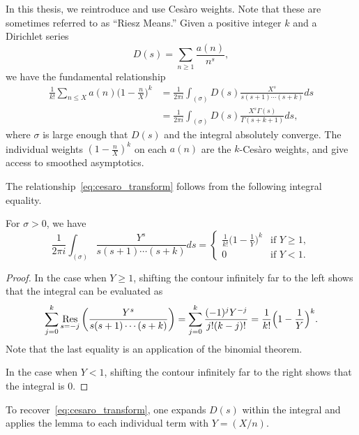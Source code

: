 In this thesis, we reintroduce and use Ces\`{a}ro weights.
Note that these are sometimes referred to as ``Riesz Means.''
Given a positive integer $k$ and a Dirichlet series
\begin{equation}
  D(s) = \sum_{n \geq 1} \frac{a(n)}{n^s},
\end{equation}
we have the fundamental relationship
\begin{equation}\label{eq:cesaro_transform}
  \begin{split}
    \frac{1}{k!} \sum_{n \leq X} a(n) \Big(1 - \frac{n}{X}\Big)^k
    &= \frac{1}{2\pi i} \int_{(\sigma)} D(s) \frac{X^s}{s(s+1)\cdots(s+k)} ds
    \\
    &= \frac{1}{2\pi i} \int_{(\sigma)} D(s) \frac{X^s\Gamma(s)}{\Gamma(s+k+1)} ds,
  \end{split}
\end{equation}
where $\sigma$ is large enough that $D(s)$ and the integral absolutely converge.
The individual weights $(1 - \frac{n}{X})^k$ on each $a(n)$ are the $k$-Ces\`{a}ro
weights, and give access to smoothed asymptotics.

The relationship~\eqref{eq:cesaro_transform} follows from the following integral
equality.
\begin{lemma}
  For $\sigma > 0$, we have
  \begin{equation}
    \frac{1}{2\pi i} \int_{(\sigma)} \frac{Y^s}{s(s+1)\cdots(s+k)} ds = \begin{cases}
      \frac{1}{k!} \big(1 - \frac{1}{Y}\big)^k & \text{if } Y \geq 1, \\
      0 & \text{if }Y < 1.
    \end{cases}
  \end{equation}
\end{lemma}
\begin{proof}
  In the case when $Y \geq 1$, shifting the contour infinitely far to the left shows that
  the integral can be evaluated as
  \begin{equation}
    \sum_{j = 0}^k \operatorname*{Res}_{s = -j} \bigg( \frac{Y^s}{s(s+1)\cdots(s+k)} \bigg) = \sum_{j =
    0}^k \frac{(-1)^j Y^{-j}}{j! (k-j)!} = \frac{1}{k!} \Big(1 - \frac{1}{Y}\Big)^k.
  \end{equation}
  Note that the last equality is an application of the binomial theorem.

  In the case when $Y < 1$, shifting the contour infinitely far to the right shows that
  the integral is $0$.
\end{proof}

To recover~\eqref{eq:cesaro_transform}, one expands $D(s)$ within the integral and applies
the lemma to each individual term with $Y = (X/n)$.



